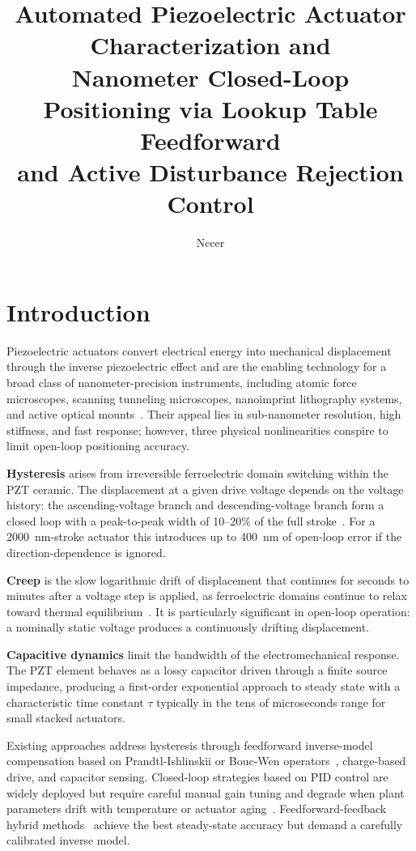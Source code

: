 \documentclass[fleqn,10pt]{wlscirep}
\title{Automated Piezoelectric Actuator Characterization and\\
Nanometer Closed-Loop Positioning via Lookup Table Feedforward\\
and Active Disturbance Rejection Control}
\author[1,*]{Nccer}
\affil[1]{Department of Precision Engineering}
\affil[*]{chanccer@gmail.com}
\begin{document}
\flushbottom
\maketitle
\thispagestyle{empty}

\section*{Introduction}

Piezoelectric actuators convert electrical energy into mechanical displacement through the inverse piezoelectric effect and are the enabling technology for a broad class of nanometer-precision instruments, including atomic force microscopes, scanning tunneling microscopes, nanoimprint lithography systems, and active optical mounts~\cite{devasia2007review,adriaens2000piezo}. Their appeal lies in sub-nanometer resolution, high stiffness, and fast response; however, three physical nonlinearities conspire to limit open-loop positioning accuracy.

\textbf{Hysteresis} arises from irreversible ferroelectric domain switching within the PZT ceramic. The displacement at a given drive voltage depends on the voltage history: the ascending-voltage branch and descending-voltage branch form a closed loop with a peak-to-peak width of 10--20\% of the full stroke~\cite{gu2016survey}. For a \SI{2000}{nm}-stroke actuator this introduces up to \SI{400}{nm} of open-loop error if the direction-dependence is ignored.

\textbf{Creep} is the slow logarithmic drift of displacement that continues for seconds to minutes after a voltage step is applied, as ferroelectric domains continue to relax toward thermal equilibrium~\cite{croft2001creep}. It is particularly significant in open-loop operation: a nominally static voltage produces a continuously drifting displacement.

\textbf{Capacitive dynamics} limit the bandwidth of the electromechanical response. The PZT element behaves as a lossy capacitor driven through a finite source impedance, producing a first-order exponential approach to steady state with a characteristic time constant $\tau$ typically in the tens of microseconds range for small stacked actuators.

Existing approaches address hysteresis through feedforward inverse-model compensation based on Prandtl-Ishlinskii or Bouc-Wen operators~\cite{xie2017piezo}, charge-based drive, and capacitor sensing. Closed-loop strategies based on PID control are widely deployed but require careful manual gain tuning and degrade when plant parameters drift with temperature or actuator aging~\cite{ang2005pid}. Feedforward-feedback hybrid methods~\cite{leang2009feedforward} achieve the best steady-state accuracy but demand a carefully calibrated inverse model.
\end{document}
